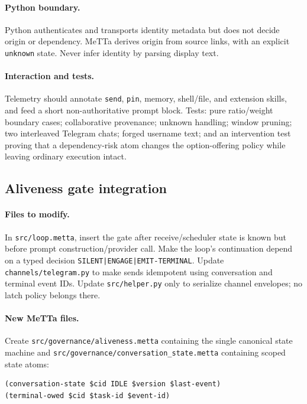\documentclass[11pt]{article}
\begin{document}
\paragraph{Python boundary.}
Python authenticates and transports identity metadata but does not decide origin
or dependency.  MeTTa derives origin from source links, with an explicit
\texttt{unknown} state.  Never infer identity by parsing display text.

\paragraph{Interaction and tests.}
Telemetry should annotate \texttt{send}, \texttt{pin}, memory, shell/file, and
extension skills, and feed a short non-authoritative prompt block.  Tests:
pure ratio/weight boundary cases; collaborative provenance; unknown handling;
window pruning; two interleaved Telegram chats; forged username text; and an
intervention test proving that a dependency-risk atom changes the option-offering
policy while leaving ordinary execution intact.

\subsection{Aliveness gate integration}

\paragraph{Files to modify.}
In \texttt{src/loop.metta}, insert the gate after receive/scheduler state is known
but before prompt construction/provider call.  Make the loop's continuation
depend on a typed decision \texttt{SILENT|ENGAGE|EMIT-TERMINAL}.  Update
\texttt{channels/telegram.py} to make sends idempotent using conversation and
terminal event IDs.  Update \texttt{src/helper.py} only to serialize channel
envelopes; no latch policy belongs there.

\paragraph{New MeTTa files.}
Create \texttt{src/governance/aliveness.metta} containing the single canonical
state machine and \texttt{src/governance/conversation\_state.metta} containing
scoped state atoms:
\begin{lstlisting}
(conversation-state $cid IDLE $version $last-event)
(terminal-owed $cid $task-id $event-id)
\end{lstlisting}
\end{document}
